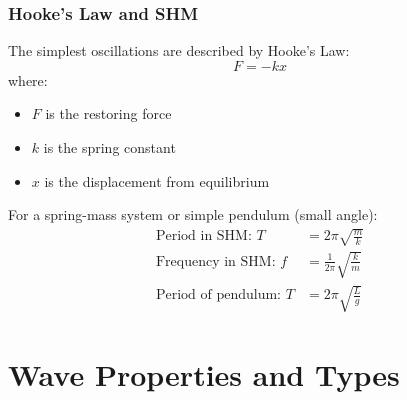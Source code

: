 \documentclass{beamer}
\begin{document}
\begin{frame}
\frametitle{Hooke's Law and SHM}
The simplest oscillations are described by Hooke's Law:
\begin{equation}
F = -kx
\end{equation}
where:
\begin{itemize}
\item $F$ is the restoring force
\item $k$ is the spring constant
\item $x$ is the displacement from equilibrium
\end{itemize}

For a spring-mass system or simple pendulum (small angle):
\begin{align}
\text{Period in SHM: } T &= 2\pi \sqrt{\frac{m}{k}} \\
\text{Frequency in SHM: } f &= \frac{1}{2\pi}\sqrt{\frac{k}{m}} \\
\text{Period of pendulum: } T &= 2\pi \sqrt{\frac{L}{g}}
\end{align}
\end{frame}

\section{Wave Properties and Types}
\end{document}
